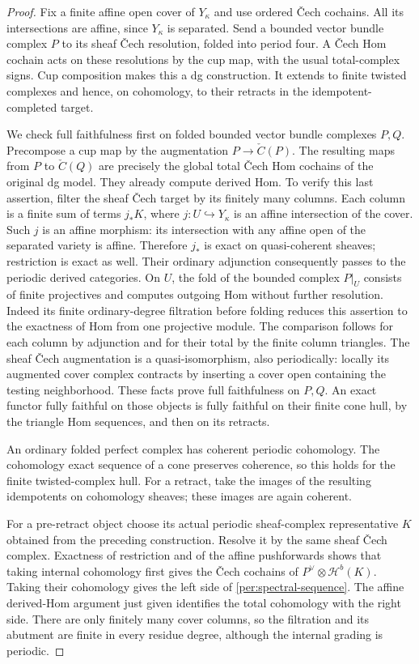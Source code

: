 \documentclass[11pt]{article}
\theoremstyle{definition}
\theoremstyle{remark}
\numberwithin{equation}{section}
\begin{document}
\begin{proof}
Fix a finite affine open cover of $Y_\kappa$ and use ordered
\v Cech cochains.  All its intersections are affine, since
$Y_\kappa$ is separated.  Send a bounded vector bundle complex $P$
to its sheaf \v Cech resolution, folded into period four.  A
\v Cech Hom cochain acts on these resolutions by the cup map, with
the usual total-complex signs.  Cup composition makes this a dg
construction.  It extends to finite twisted complexes and hence,
on cohomology, to their retracts in the idempotent-completed target.

We check full faithfulness first on folded bounded vector bundle
complexes $P,Q$.  Precompose a cup map by the augmentation
$P\to\check C(P)$.  The resulting maps from $P$ to
$\check C(Q)$ are precisely the global total \v Cech Hom
cochains of the original dg model.  They already compute derived
Hom.  To verify this last assertion, filter the sheaf \v Cech target
by its finitely many columns.  Each column is a finite sum of
terms $j_*K$, where $j:U\hookrightarrow Y_\kappa$ is an affine
intersection of the cover.  Such $j$ is an affine morphism:
its intersection with any affine open of the separated variety is
affine.  Therefore $j_*$ is exact on quasi-coherent sheaves;
restriction is exact as well.  Their ordinary adjunction consequently
passes to the periodic derived categories.  On $U$, the fold of the
bounded complex $P|_U$ consists of finite projectives and computes
outgoing Hom without further resolution.  Indeed its finite
ordinary-degree filtration before folding reduces this assertion
to the exactness of Hom from one projective module.  The comparison follows
for each column by adjunction and for their total by the finite
column triangles.  The sheaf \v Cech augmentation is a
quasi-isomorphism, also periodically: locally its augmented cover
complex contracts by inserting a cover open containing the testing
neighborhood.  These facts prove full faithfulness on $P,Q$.
An exact functor fully faithful on those objects is fully faithful
on their finite cone hull, by the triangle Hom sequences, and then
on its retracts.

An ordinary folded perfect complex has coherent periodic cohomology.
The cohomology exact sequence of a cone preserves coherence, so this
holds for the finite twisted-complex hull.  For a retract, take the
images of the resulting idempotents on cohomology sheaves; these
images are again coherent.

For a pre-retract object choose its actual periodic sheaf-complex
representative $K$ obtained from the preceding construction.
Resolve it by the same sheaf \v Cech complex.  Exactness of
restriction and of the affine pushforwards shows that taking
internal cohomology first gives the \v Cech cochains of
$P^\vee\otimes\mathcal H^b(K)$.  Taking their cohomology gives
the left side of \eqref{per:spectral-sequence}.  The affine
derived-Hom argument just given identifies the total cohomology
with the right side.  There are only finitely many cover columns,
so the filtration and its abutment are finite in every residue
degree, although the internal grading is periodic.


\end{proof}
\end{document}
